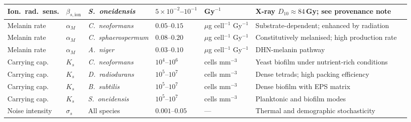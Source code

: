\documentclass[11pt]{article}
\begin{document}
\begin{landscape}
\begin{longtable}{@{}p{2.35cm}lp{3.25cm}p{3.0cm}p{2.5cm}p{8.2cm}c@{}}
Ion.\ rad.\ sens. & $\beta_{s,\mathrm{ion}}$ & \textit{S.\ oneidensis}     & $5\!\times\!10^{-2}$--$10^{-1}$  & Gy$^{-1}$ & X-ray $D_{10}\approx84$\,Gy; see provenance note & \cite{brown2015} \\
\midrule
Melanin rate & $\alpha_M$ & \textit{C.\ neoformans}     & $0.05$--$0.15$ & $\mu$g cell$^{-1}$ Gy$^{-1}$ & Substrate-dependent; enhanced by radiation & \cite{dadachova2007} \\
Melanin rate & $\alpha_M$ & \textit{C.\ sphaerospermum} & $0.08$--$0.20$ & $\mu$g cell$^{-1}$ Gy$^{-1}$ & Constitutively melanised; high production rate & \cite{zhdanova2000,shunk2022} \\
Melanin rate & $\alpha_M$ & \textit{A.\ niger}          & $0.03$--$0.10$ & $\mu$g cell$^{-1}$ Gy$^{-1}$ & DHN-melanin pathway & \cite{dadachova2008} \\
\midrule
Carrying cap. & $K_s$ & \textit{C.\ neoformans}    & $10^4$--$10^6$ & cells mm$^{-3}$ & Yeast biofilm under nutrient-rich conditions & \cite{dadachova2007} \\
Carrying cap. & $K_s$ & \textit{D.\ radiodurans}   & $10^5$--$10^7$ & cells mm$^{-3}$ & Dense tetrads; high packing efficiency & \cite{slade2011} \\
Carrying cap. & $K_s$ & \textit{B.\ subtilis}      & $10^5$--$10^7$ & cells mm$^{-3}$ & Dense biofilm with EPS matrix & \cite{guttenplan2013} \\
Carrying cap. & $K_s$ & \textit{S.\ oneidensis}    & $10^5$--$10^7$ & cells mm$^{-3}$ & Planktonic and biofilm modes & \cite{heidelberg2002} \\
\midrule
Noise intensity  & $\sigma_s$ & All species & $0.001$--$0.05$ & ---           & Thermal and demographic stochasticity & \cite{campillo2017} \\
\end{longtable}
\end{landscape}

\end{document}
